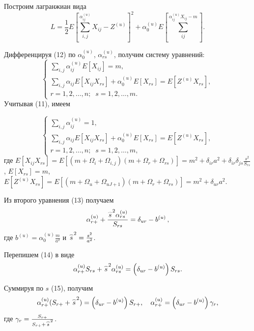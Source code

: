 Построим лагранжиан вида
\begin{equation}
L=\frac{1}{2}E\left[ {\sum_{i,j}^ {\alpha _{ij}^{(u)} } X_{ij} -Z^{(u)}} \right]^2+\alpha _0^{(u)} E\left[ {\sum_{ij}^ {\alpha _{ij}^{(u)} X_{ij} -m} } \right] .
\end{equation}

Дифференцируя (12) по $\alpha _0^{(u)}$, $\alpha _{rs}^{(u)} $, получим
систему уравнений:
\[
\left\{
\begin{array}{l}
\displaystyle
 \sum_{i,j} \alpha _{ij}^{(u)} E[X_{ij} ] =m, \\
\displaystyle
 \sum_{i,j} \alpha _{ij} E[X_{ij} X_{rs}] +\alpha _0^{(u)} E[X_{rs} ]=E[Z^{(u)}X_{rs} ],\\
 r=1, 2, \dots, n;\;\; s=1, 2, \dots, m.
 \end{array} \right.
\]
Учитывая (11), имеем

\begin{equation}
 \left\{ \begin{array}{l}
 \displaystyle \sum_{i,j} \alpha _{ij}^{(u)}  =1, \\
 \displaystyle \sum_{i,j} \alpha _{ij} E[X_{ij} X_{rs} ] +\alpha _0^{(u)} E[X_{rs} ]=E[Z^{(u)}X_{rs} ],\\
r=1, 2, \dots, n; \;\;s=1, 2, \dots, m,
 \end{array} \right.
\end{equation}
где
$E[X_{ij} X_{rs} ]=E[(m+\Omega _i +\Omega _{i,j} )(m+\Omega _r +\Omega
_{rs} )]=m^2+\delta _{ir} a^2+\delta _{ir} \delta _{js} \frac{s^2}{S_{rs}}$,
$E[X_{rs} ]=m$,
$E[Z^{\left( u \right)}X_{rs} ]= E[(m+\Omega _u
+\Omega _{uJ+1} )(m+\Omega _r +\Omega _{rs} )]=m^2+\delta _{ur} a^2$.

Из второго уравнения (13) получаем
\begin{equation}
 \alpha _{r+}^{(u)} +\frac{\mathord{\buildrel{\lower3pt\hbox{$\scriptscriptstyle\frown$}}\over {s}} ^2\alpha _{rs}^{(u)} }{S_{rs} }=\delta _{ur} -b^{(u)}\,,
\end{equation}
где $b^{(u)}=\alpha _0^{(u)} \frac{m}{a^2}$ и
$\mathord{\buildrel{\lower3pt\hbox{$\scriptscriptstyle\frown$}}\over {s}}^2=\frac{s^2}{a^2}$.

Перепишем (14) в виде
\begin{equation}
\alpha _{r+}^{(u)} S_{rs} +\mathord{\buildrel{\lower3pt\hbox{$\scriptscriptstyle\frown$}}\over {s}} ^2\alpha _{rs}^{(u)} =
\left( {\delta _{ur} -b^{(u)}} \right)S_{rs}.
\end{equation}

Суммируя по $s$ (15), получим
\begin{equation}
\alpha _{r+}^{(u)} (S_{r+} +\mathord{\buildrel{\lower3pt\hbox{$\scriptscriptstyle\frown$}}\over {s}} ^2)=\left( {\delta _{ur} -b^{(u)}} \right)S_{r+} ,
\quad
 \alpha _{r+}^{(u)} =\left( {\delta _{ur} -b^{(u)}} \right)\gamma _r ,
\end{equation}
где $\gamma _r =\frac{S_{r+} }{S_{r+}+\mathord{\buildrel{\lower3pt\hbox{$\scriptscriptstyle\frown$}}\over {s}}^2}$.


